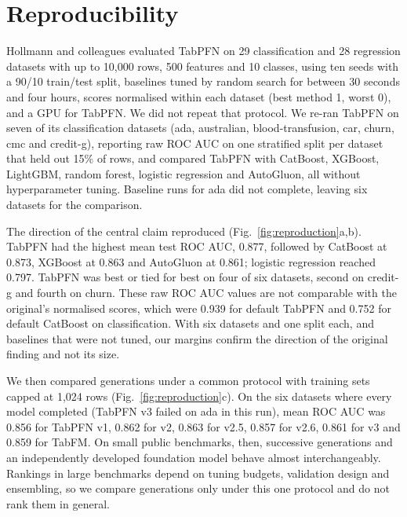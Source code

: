 \section*{Reproducibility}

Hollmann and colleagues evaluated TabPFN on 29 classification and 28 regression datasets with up to 10,000 rows, 500 features and 10 classes, using ten seeds with a 90/10 train/test split, baselines tuned by random search for between 30 seconds and four hours, scores normalised within each dataset (best method 1, worst 0), and a GPU for TabPFN.\citep{hollmann2025accurate} We did not repeat that protocol. We re-ran TabPFN on seven of its classification datasets (ada, australian, blood-transfusion, car, churn, cmc and credit-g), reporting raw ROC AUC on one stratified split per dataset that held out 15\% of rows, and compared TabPFN with CatBoost, XGBoost, LightGBM, random forest, logistic regression and AutoGluon, all without hyperparameter tuning. Baseline runs for ada did not complete, leaving six datasets for the comparison.

The direction of the central claim reproduced (Fig.~\ref{fig:reproduction}a,b). TabPFN had the highest mean test ROC AUC, 0.877, followed by CatBoost at 0.873, XGBoost at 0.863 and AutoGluon at 0.861; logistic regression reached 0.797. TabPFN was best or tied for best on four of six datasets, second on credit-g and fourth on churn. These raw ROC AUC values are not comparable with the original's normalised scores, which were 0.939 for default TabPFN and 0.752 for default CatBoost on classification.\citep{hollmann2025accurate} With six datasets and one split each, and baselines that were not tuned, our margins confirm the direction of the original finding and not its size.

We then compared generations under a common protocol with training sets capped at 1,024 rows (Fig.~\ref{fig:reproduction}c). On the six datasets where every model completed (TabPFN v3 failed on ada in this run), mean ROC AUC was 0.856 for TabPFN v1, 0.862 for v2, 0.863 for v2.5, 0.857 for v2.6, 0.861 for v3 and 0.859 for TabFM. On small public benchmarks, then, successive generations and an independently developed foundation model behave almost interchangeably. Rankings in large benchmarks depend on tuning budgets, validation design and ensembling,\citep{erickson2025tabarena,qu2025tabicl} so we compare generations only under this one protocol and do not rank them in general.

